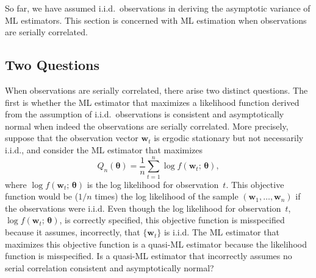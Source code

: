 
So far, we have assumed i.i.d.\ observations in deriving the asymptotic variance of
ML estimators. This section is concerned with ML estimation when observations
are serially correlated.

\subsection*{Two Questions}

When observations are serially correlated, there arise two distinct questions. The
first is whether the ML estimator that maximizes a likelihood function derived from
the assumption of i.i.d.\ observations is consistent and asymptotically normal when
indeed the observations are serially correlated. More precisely, suppose that the
observation vector $\mathbf{w}_t$ is ergodic stationary but not necessarily i.i.d., and consider
the ML estimator that maximizes
\begin{equation}
  Q_n(\boldsymbol{\theta})
  = \frac{1}{n}\sum_{t=1}^{n} \log f(\mathbf{w}_t;\, \boldsymbol{\theta}),
  \label{eq:8.7.1} \tag{8.7.1}
\end{equation}
where $\log f(\mathbf{w}_t;\, \boldsymbol{\theta})$ is the log likelihood for observation~$t$. This objective function
would be ($1/n$ times) the log likelihood of the sample $(\mathbf{w}_1, \ldots, \mathbf{w}_n)$ if the observations were i.i.d. Even though the log likelihood for observation~$t$,
$\log f(\mathbf{w}_t;\, \boldsymbol{\theta})$,
is correctly specified, this objective function is misspecified because it assumes,
incorrectly, that $\{\mathbf{w}_t\}$ is i.i.d. The ML estimator that maximizes this objective function is a quasi-ML estimator because the likelihood function is misspecified. Is a
quasi-ML estimator that incorrectly assumes no serial correlation consistent and
asymptotically normal?

